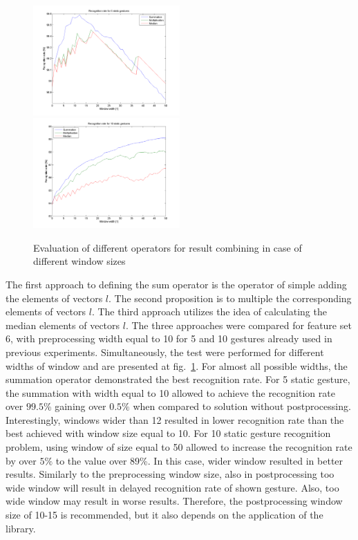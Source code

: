 \begin{figure}[htb]
\centering

\centerline{%
 \includegraphics[width=0.5\textwidth]{figures/Mul5.png}
 \includegraphics[width=0.5\textwidth]{figures/Mul10.png}
 }%
 \caption{Evaluation of different operators for result combining in case of different window sizes}
 \label{staticoper}
\end{figure}

 

The first approach to defining the sum operator is the operator of simple adding the elements of vectors $l$.
The second proposition is to multiple the corresponding elements of vectors $l$. 
The third approach utilizes the idea of calculating the median elements of vectors $l$.
The three approaches were compared for feature set 6, with preprocessing width equal to 10 for 5 and 10 gestures already used in previous experiments.
Simultaneously, the test were performed for different widths of window and are presented at fig.~\ref{staticoper}.
For almost all possible widths, the summation operator demonstrated the best recognition rate.
For 5 static gesture, the summation with width equal to 10 allowed to achieve the recognition rate over $99.5$\% gaining over $0.5\%$ when compared to solution without postprocessing.
Interestingly, windows wider than 12 resulted in lower recognition rate than the best achieved with window size equal to 10.
For 10 static gesture recognition problem, using window of size equal to 50 allowed to increase the recognition rate by over $5\%$ to the value over $89$\%.
In this case, wider window resulted in better results. 
Similarly to the preprocessing window size, also in postprocessing too wide window will result in delayed recognition rate of shown gesture.
Also, too wide window may result in worse results.
Therefore, the postprocessing window size of 10-15 is recommended, but it also depends on the application of the library.

